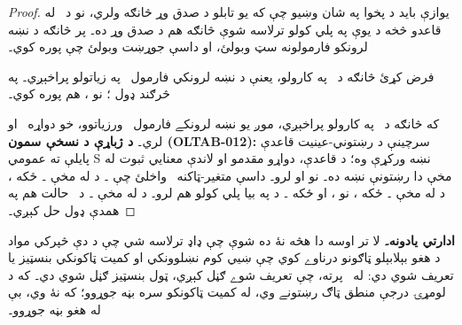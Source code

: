 \documentclass[12pt,a4paper,oneside]{report}
\theoremstyle{definition}
\newenvironment{editorial}{\begin{framed}\textbf{ادارتي يادونه۔}\enspace}{\end{framed}}
\begin{document}
\label{olpseg:OLP-0111-B007:start}
\begin{proof}
يوازې بايد د پخوا په شان وښيو چې که يو تابلو د صدق وړ
څانګه ولري، نو د~\LR{$\eq$} له قاعدو څخه د يوې په پلي کولو ترلاسه شوې
څانګه هم د صدق وړ ده۔ \LR{$\Gamma$} پر څانګه د نښه لرونکو فارمولونه
سټ وبولئ، او  داسې جوړښت وبولئ چې \LR{$\Gamma$}
پوره کوي۔
\label{olpseg:OLP-0111-B007:end}

\label{olpseg:OLP-0111-B008:start}
فرض کړئ څانګه د~\LR{$\eq$} په کارولو، يعنې د نښه لرونکي
فارمول~\LR{$\sFmla{\True}{\eq[t][t]}$} په زياتولو پراخېږي۔ په
څرګند ډول ؛ نو ،
\LR{$\Gamma \cup \{\sFmla{\True}{\eq[t][t]}\}$} هم پوره کوي۔
\label{olpseg:OLP-0111-B008:end}

\label{olpseg:OLP-0111-B009:start}
که څانګه د~\LR{$\TRule{\True}{\eq}$} په کارولو پراخېږي، موږ يو نښه
لرونکے فارمول~ ورزياتوو، خو \LR{$\Gamma$}
دواړه~\LR{$\sFmla{\True}{\eq[t_1][t_2]}$} او
 لري۔
\textbf{د ژباړې د نسخې سمون (OLTAB-012):} سرچينې د رښتوني-عينيت
قاعدې پايلې ته عمومي S نښه ورکړې وه؛ د قاعدې، دواړو مقدمو او
لاندې معنايي ثبوت له مخې دا رښتونې نښه ده۔
نو  او  لرو۔ داسې
متغير-ټاکنه~ واخلئ چې ۔ د
 له مخې
۔ ځکه ، د
 له مخې ۔
ځکه ، نو
، او ځکه
۔ د
 په بيا پلي کولو
 هم لرو۔ د
 له مخې
۔ د~\LR{$\TRule{\False}{\eq}$} حالت هم په همدې ډول
حل کېږي۔
\end{proof}
\label{olpseg:OLP-0111-B009:end}

\label{olpseg:OLP-0112-B004:start}
\label{olpseg:OLP-0112-B004:end}

\label{olpseg:OLP-0112-B005:start}
\begin{editorial}
  لا تر اوسه دا هڅه نۀ ده شوې چې ډاډ ترلاسه شي چې د دې څپرکي مواد
  د هغو بېلابېلو ټاګونو درناوے کوي چې ښيي کوم نښلوونکي او کميت
  ټاکونکي بنسټيز يا تعريف شوي دي: له~\LR{$\liff$} پرته، چې تعريف شوے
  ګڼل کېږي، ټول بنسټيز ګڼل شوي دي۔ که د لومړۍ درجې منطق ټاګ رښتونے
  وي، له کميت ټاکونکو سره بڼه جوړوو؛ که نۀ وي، بې له هغو بڼه جوړوو۔
\end{editorial}
\label{olpseg:OLP-0112-B005:end}
\end{document}
